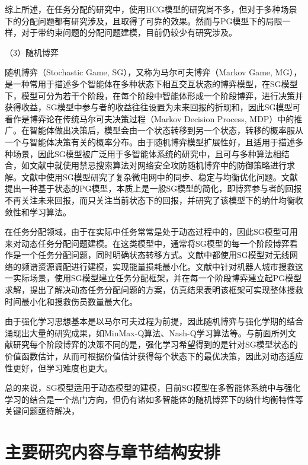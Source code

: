 综上所述，在任务分配的研究中，使用HCG模型的研究尚不多，但对于多种场景下的分配问题都有研究涉及，且取得了可靠的效果。然而与PG模型下的局限一样，对于带约束问题的分配问题建模，目前仍较少有研究涉及。

（3）随机博弈

随机博弈（Stochastic Game, SG），又称为马尔可夫博弈（Markov Game, MG），是一种常用于描述多个智能体在多种状态下相互交互状态的博弈模型，在SG模型下，模型可分为若干个阶段，在每个阶段中智能体形成一个阶段博弈，进行决策并获得收益，SG模型中参与者的收益往往设置为未来回报的折现和，因此SG模型可看作是博弈论在传统马尔可夫决策过程（Markov Decision Process, MDP）中的推广\cite{lishihao_2019}。在智能体做出决策后，模型会由一个状态转移到另一个状态，转移的概率服从一个与智能体决策有关的概率分布。由于随机博弈模型扩展性好，且适用于描述多种场景，因此SG模型被广泛用于多智能体系统的研究中，且可与多种算法相结合，如文献\parencite{sunqian_2020}中就使用禁忌搜索算法对网络安全攻防随机博弈中的防御策略进行求解。文献\parencite{zhouhong_2020}中使用SG模型研究了复杂微电网中的同步、稳定与均衡优化问题。文献\parencite{marden_state_2012}提出一种基于状态的PG模型，本质上是一般SG模型的简化，即博弈参与者的回报不再关注未来回报，而只关注当前状态下的回报，并研究了该模型下的纳什均衡收敛性和学习算法。

在任务分配领域，由于在实际中任务常常是处于动态过程中的，因此SG模型可用来对动态任务分配问题建模。在这类模型中，通常将SG模型的每一个阶段博弈看作是一个任务分配问题，同时明确状态转移方式。文献\parencite{liu_stochastic_2013}中都使用SG模型对无线网络的频谱资源调配进行建模，实现能量损耗最小化。文献\parencite{chapman_2010}中针对机器人城市搜救这一实际场景，使用SG模型建立任务分配框架，并在每一个阶段博弈建立起PG模型求解，提出了解决动态任务分配问题的方案，仿真结果表明该框架可实现整体搜救时间最小化和搜救伤员数量最大化。

由于强化学习思想基本是以马尔可夫过程为前提，因此随机博弈与强化学期的结合涌现出大量的研究成果\cite{mawen_2020}，如MinMax-Q算法、Nash-Q学习算法\cite{liuhao_2020}等。与前面所列文献研究每个阶段博弈的决策不同的是，强化学习希望得到的是针对SG模型状态的价值函数估计，从而可根据价值估计获得每个状态下的最优决策，因此对动态适应性更好，但学习难度也更大\cite{marden_state_2012}。

总的来说，SG模型适用于动态模型的建模，目前SG模型在多智能体系统中与强化学习的结合是一个热门方向，但仍有诸如多智能体的随机博弈下的纳什均衡特性等关键问题亟待解决，





\section{主要研究内容与章节结构安排}
\label{mainwork}

